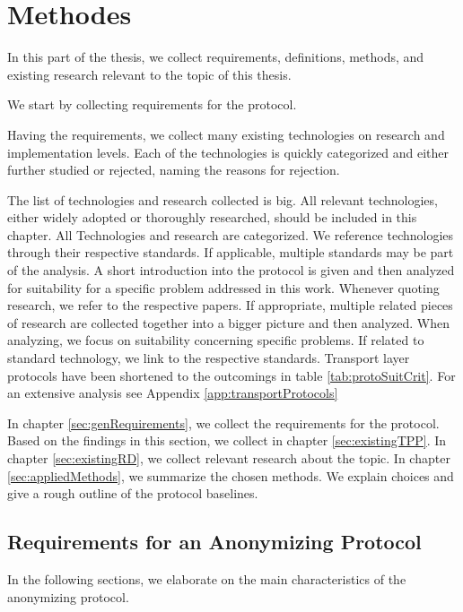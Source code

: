 

\part{Methodes}
In this part of the thesis, we collect requirements, definitions, methods, and existing research relevant to the topic of this thesis. 

We start by collecting requirements for the protocol.

Having the requirements, we collect many existing technologies on research and implementation levels. Each of the technologies is quickly categorized and either further studied or rejected, naming the reasons for rejection.

The list of technologies and research collected is big. All relevant technologies, either widely adopted or thoroughly researched, should be included in this chapter. All Technologies and research are categorized. We reference technologies through their respective standards. If applicable, multiple standards may be part of the analysis. A short introduction into the protocol is given and then analyzed for suitability for a specific problem addressed in this work. Whenever quoting research, we refer to the respective papers. If appropriate, multiple related pieces of research are collected together into a bigger picture and then analyzed. When analyzing, we focus on suitability concerning specific problems. If related to standard technology, we link to the respective standards. Transport layer protocols have been shortened to the outcomings in table \ref{tab:protoSuitCrit}. For an extensive analysis see Appendix \ref{app:transportProtocols}

In chapter \ref{sec:genRequirements}, we collect the requirements for the protocol. Based on the findings in this section, we collect in chapter \ref{sec:existingTPP}. In chapter \ref{sec:existingRD}, we collect relevant research about the topic. In chapter \ref{sec:appliedMethods}, we summarize the chosen methods. We explain choices and give a rough outline of the protocol baselines.

\chapter{Requirements for an Anonymizing Protocol\label{sec:genRequirements}}
In the following sections, we elaborate on the main characteristics of the anonymizing protocol. 

